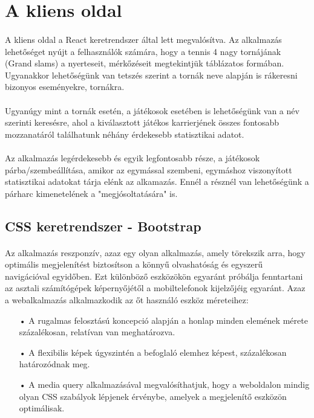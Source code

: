 \section{A kliens oldal}
\paragraph{}
A kliens oldal a  React keretrendszer által lett megvalósítva. Az alkalmazás lehetőséget nyújt a felhasználók számára, hogy a tennis 4 nagy tornájának (Grand slams) a nyerteseit, mérkőzéseit megtekintjük táblázatos formában. Ugyanakkor lehetőségünk van tetszés szerint a tornák neve alapján is rákeresni bizonyos eseményekre, tornákra. 
\paragraph{}
Ugyanúgy mint a tornák esetén, a játékosok esetében is lehetőségünk van a név szerinti keresésre, ahol a kiválasztott játékos karrierjének összes fontosabb mozzanatáról találhatunk néhány érdekesebb statisztikai adatot.
\paragraph{}
Az alkalmazás legérdekesebb és egyik legfontosabb része, a játékosok párba/szembeállítása, amikor az egymással szembeni, egymáshoz viszonyított statisztikai adatokat tárja elénk az alkamazás. Ennél a résznél van lehetőségünk a párharc kimenetelének a "megjósoltatására" is.

\subsection{CSS keretrendszer - Bootstrap}
\paragraph{}
Az alkalmazás reszponzív, azaz egy olyan alkalmazás, amely törekszik arra, hogy optimális megjelenítést biztosítson a könnyű olvashatóság és egyszerű navigációval egyidőben. Ezt különböző eszközökön egyaránt próbálja fenntartani az asztali számítógépek képernyőjétől a mobiltelefonok kijelzőjéig egyaránt. Azaz a webalkalmazás alkalmazkodik az őt használó eszköz méreteihez:
\begin{enumerate}
\item[•] A rugalmas felosztású koncepció alapján a honlap minden elemének mérete százalékosan, relatívan van meghatározva.
\item[•] A flexibilis képek úgyszintén a befoglaló elemhez képest, százalékosan határozódnak meg.
\item[•] A media query alkalmazásával megvalósíthatjuk, hogy a weboldalon mindig olyan CSS szabályok lépjenek érvénybe, amelyek a megjelenítő eszközön optimálisak.
\end{enumerate}

